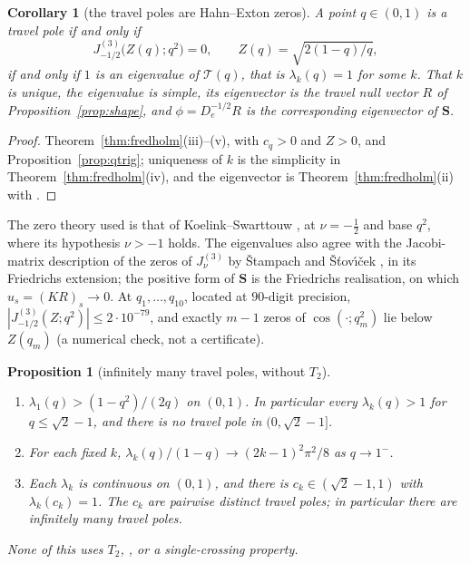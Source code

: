 \documentclass[11pt]{article}
\theoremstyle{plain}
\newtheorem{corollary}[theorem]{Corollary}
\newtheorem{proposition}[theorem]{Proposition}
\theoremstyle{definition}
\theoremstyle{remark}
\theoremstyle{plain}\newtheorem*{maintheorem}{Main Theorem}
\begin{document}
\begin{corollary}[the travel poles are Hahn--Exton zeros]\label{cor:qbessel}
A point $q\in(0,1)$ is a travel pole if and only if
\[
   J^{(3)}_{-1/2}\bigl(Z(q);q^2\bigr)=0,\qquad Z(q)=\sqrt{2(1-q)/q},
\]
if and only if $1$ is an eigenvalue of $\mathcal T(q)$, that is $\lambda_k(q)=1$ for some $k$. That
$k$ is unique, the eigenvalue is simple, its eigenvector is the travel null vector $R$ of
Proposition~\ref{prop:shape}, and $\phi=D_e^{-1/2}R$ is the corresponding eigenvector of $\mathbf S$.
\end{corollary}

\begin{proof}
Theorem~\ref{thm:fredholm}\textup{(iii)--(v)}, with $c_q>0$ and $Z>0$, and
Proposition~\ref{prop:qtrig}; uniqueness of $k$ is the simplicity in
Theorem~\ref{thm:fredholm}\textup{(iv)}, and the eigenvector is Theorem~\ref{thm:fredholm}\textup{(ii)}
with {\cite[Lemma ``the null space is at most one-dimensional'', \textup{lem:nullspace}]{Bonfioli2026bB}}.
\end{proof}

\noindent The zero theory used is that of Koelink--Swarttouw \cite{KoelinkSwarttouw1994}, at
$\nu=-\tfrac12$ and base $q^2$, where its hypothesis $\nu>-1$ holds. The eigenvalues also agree with
the Jacobi-matrix description of the zeros of $J^{(3)}_\nu$ by \v{S}tampach and \v{S}\v{t}ov\'{\i}\v{c}ek
\cite{StampachStovicek2014}, in its Friedrichs extension; the positive form of $\mathbf S$ is the
Friedrichs realisation, on which $u_s=(KR)_s\to0$. At $q_1,\dots,q_{10}$, located at $90$-digit
precision, $|J^{(3)}_{-1/2}(Z;q^2)|\le2\cdot10^{-79}$, and exactly $m-1$ zeros of
$\cos(\cdot;q_m^2)$ lie below $Z(q_m)$ (a numerical check, not a certificate).

\begin{proposition}[infinitely many travel poles, without $T_2$]\label{prop:infpolesalt}
\begin{enumerate}[label=\textup{(\alph*)},leftmargin=2.2em,itemsep=0.1em,topsep=0.2em]
\item $\lambda_1(q)>(1-q^2)/(2q)$ on $(0,1)$. In particular every $\lambda_k(q)>1$ for
$q\le\sqrt2-1$, and there is no travel pole in $(0,\sqrt2-1]$.
\item For each fixed $k$, $\lambda_k(q)/(1-q)\to(2k-1)^2\pi^2/8$ as $q\to1^-$.
\item Each $\lambda_k$ is continuous on $(0,1)$, and there is $c_k\in(\sqrt2-1,1)$ with
$\lambda_k(c_k)=1$. The $c_k$ are pairwise distinct travel poles; in particular there are infinitely
many travel poles.
\end{enumerate}
None of this uses $T_2$, {\cite[Lemma ``absolute bound on $T_2$'', \textup{lem:T2abs}]{Bonfioli2026bB}}, or a single-crossing property.
\end{proposition}
\end{document}
